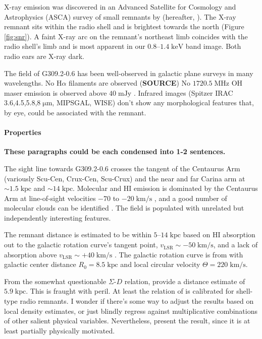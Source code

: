 \documentclass[preprint2,tighten,trackchanges]{aastex6}
\newcommand*{\mt}{\mathrm}
\newcommand*{\unit}[1]{\;\mt{#1}}  %
\newcommand*{\abt}{\mathord{\sim}} %
\begin{document}
X-ray emission was discovered in an Advanced Satellite for Cosmology and
Astrophysics (ASCA) survey of small remnants by \citet{rakowski2001}
(hereafter, ).
The X-ray remnant sits within the radio shell and is brightest towards the
north (Figure \ref{fig:snr}).
A faint X-ray arc on the remnant's northeast limb coincides with the radio
shell's limb and is most apparent in our $0.8$--$1.4 \unit{keV}$ band image.
Both radio ears are X-ray dark.

The field of G309.2-0.6 has been well-observed in galactic plane surveys in
many wavelengths.
No H$\alpha$ filaments are observed (\textbf{SOURCE}) %
No $1720.5 \unit{MHz}$ OH maser emission is observed above $40 \unit{mJy}$
\citep{green1997}.
Infrared images (Spitzer IRAC 3.6,4.5,5.8,$8 \unit{{\mu}m}$, MIPSGAL, WISE)
don't show any morphological features that, by eye, could be associated with
the remnant.

\paragraph{Properties}

\textbf{These paragraphs could be each condensed into 1-2 sentences.}

The sight line towards G309.2-0.6 crosses the tangent of the Centaurus Arm
(variously Scu-Cen, Crux-Cen, Scu-Crux) and the near and far Carina arm at
$\abt 1.5 \unit{kpc}$ and $\abt 14 \unit{kpc}$.  Molecular and HI emission is
dominated by the Centaurus Arm at line-of-sight velocities $-70$ to
$-20 \unit{km/s}$ \citep[e.g.,][Figure 4]{dame2011}, and a good number of
molecular clouds can be identified \citep{rice2016}.  The field is populated
with unrelated but independently interesting features.

The remnant distance is estimated to be within $5$--$14 \unit{kpc}$ based on HI
absorption out to the galactic rotation curve's tangent point, $v_{\mt{LSR}}
\sim -50 \unit{km/s}$, and a lack of absorption above $v_{\mt{LSR}} \sim +40
\unit{km/s}$ .  The galactic rotation curve is from
\citet{fich1989} with galactic center distance $R_0 = 8.5 \unit{kpc}$ and local
circular velocity $\Theta = 220 \unit{km/s}$.

From the somewhat questionable $\Sigma$-$D$ relation, \citet{pavlovic2014}
provide a distance estimate of $5.9 \unit{kpc}$.
This is fraught with peril.
At least the relation of \citet{pavlovic2014} is calibrated for shell-type
radio remnants.
I wonder if there's some way to adjust the results based on local density
estimates, or just blindly regress against multiplicative combinations of other
salient physical variables.
Nevertheless, present the result, since it is at least partially physically
motivated.
\end{document}
